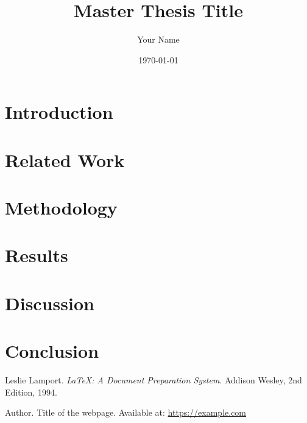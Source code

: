 \documentclass[a4paper, 12pt]{report}
\title{Master Thesis Title}
\author{Your Name}
\date{\today}
\begin{document}
\maketitle
\thispagestyle{empty}
\newpage

\begin{abstract}
    \lipsum[1-2] %
\end{abstract}

\newpage
\tableofcontents
\newpage

\chapter{Introduction}
\lipsum[3-5] %

\chapter{Related Work}
\lipsum[6-8] %

\chapter{Methodology}
\lipsum[9-11] %

\chapter{Results}
\lipsum[12-14] %

\chapter{Discussion}
\lipsum[15-17] %

\chapter{Conclusion}
\lipsum[18-19] %

\newpage
\begin{thebibliography}{9}
    Leslie Lamport. 
    \textit{LaTeX: A Document Preparation System}. 
    Addison Wesley, 2nd Edition, 1994.

    Author. 
    Title of the webpage. 
    Available at: \url{https://example.com}

\end{thebibliography}
\end{document}
